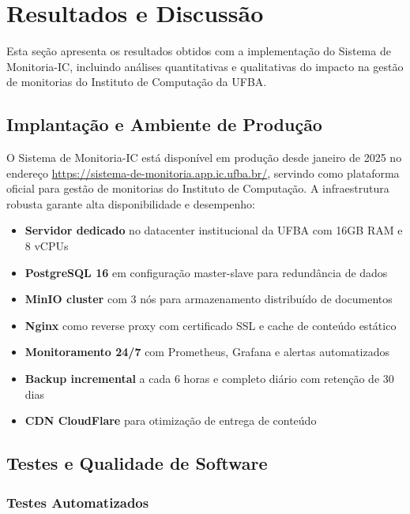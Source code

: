 \documentclass[portuguese]{sbc2025}%
\begin{document}
\section{Resultados e Discussão}
\label{sec:results}

Esta seção apresenta os resultados obtidos com a implementação do Sistema de Monitoria-IC, incluindo análises quantitativas e qualitativas do impacto na gestão de monitorias do Instituto de Computação da UFBA.

\subsection{Implantação e Ambiente de Produção}

O Sistema de Monitoria-IC está disponível em produção desde janeiro de 2025 no endereço \url{https://sistema-de-monitoria.app.ic.ufba.br/}, servindo como plataforma oficial para gestão de monitorias do Instituto de Computação. A infraestrutura robusta garante alta disponibilidade e desempenho:

\begin{itemize}
  \item \textbf{Servidor dedicado} no datacenter institucional da UFBA com 16GB RAM e 8 vCPUs
  \item \textbf{PostgreSQL 16} em configuração master-slave para redundância de dados
  \item \textbf{MinIO cluster} com 3 nós para armazenamento distribuído de documentos
  \item \textbf{Nginx} como reverse proxy com certificado SSL e cache de conteúdo estático
  \item \textbf{Monitoramento 24/7} com Prometheus, Grafana e alertas automatizados
  \item \textbf{Backup incremental} a cada 6 horas e completo diário com retenção de 30 dias
  \item \textbf{CDN CloudFlare} para otimização de entrega de conteúdo
\end{itemize}

\subsection{Testes e Qualidade de Software}

\subsubsection{Testes Automatizados}
\end{document}

